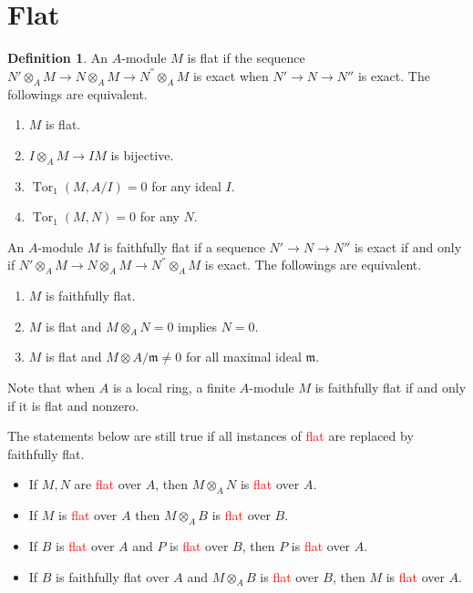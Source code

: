 \documentclass[leqno]{amsart}
\newcommand{\1}{\mathbf{1}}
\newcommand{\fm}{\mathfrak m}
\DeclareMathOperator{\Tor}{Tor}
\theoremstyle{definition}
\newtheorem{defn}[thm]{Definition}
\theoremstyle{remark}
\newcommand{\red}[1]{\textcolor{Red}{#1}}
\begin{document}
\section{Flat}

\begin{defn}
	An $A$-module $M$ is flat if the sequence
	$N'\otimes_AM\to N\otimes_AM\to N^{''}\otimes_AM$ is exact
	when $N'\to N\to N''$ is exact.
	The followings are equivalent.
\begin{enumerate}
	\item $M$ is flat.
	\item $I\otimes_AM\to IM$ is bijective.
	\item $\Tor_1(M,A/I)=0$ for any ideal $I$.
	\item $\Tor_1(M,N)=0$ for any $N$.
\end{enumerate}
	An $A$-module $M$ is faithfully flat if 
	a sequence $N'\to N\to N''$ is exact if and only if
	$N'\otimes_AM\to N\otimes_AM\to 
	N^{''}\otimes_AM$ is exact.
	The followings are equivalent.
\begin{enumerate}
	\item $M$ is faithfully flat.
	\item $M$ is flat and $M\otimes_AN=0$ implies  $N=0$.
	\item $M$ is flat and $M\otimes A/\fm\neq 0$
	for all maximal ideal  $\fm$.
\end{enumerate}
Note that when $A$ is a local ring, 
a finite $A$-module $M$ is faithfully flat if and only if 
it is flat and nonzero.
\end{defn}
The statements below are still true if all
instances of \red{flat} are replaced by faithfully flat.
\begin{itemize}
	\item If $M,N$ are \red{flat} over $A$,
	then  $M\otimes_AN$ is \red{flat} over $A$.
	\item If $M$ is \red{flat} over $A$
	then $M\otimes_AB$ is \red{flat} over $B$.
	\item If $B$ is \red{flat} over  $A$ and 
	$P$ is \red{flat} over $B$, 
	then $P$ is \red{flat} over $A$.
	\item If $B$ is faithfully flat over $A$ 
	and $M\otimes_AB$ is \red{flat} over $B$,
	then $M$ is \red{flat} over $A$.
\end{itemize}
\end{document}
